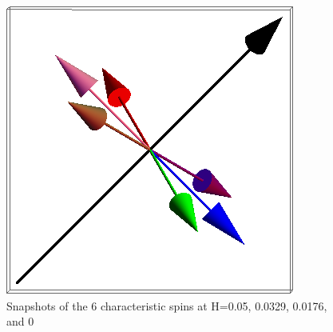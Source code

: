 \documentclass{article}
\begin{document}
\begin{figure}[ht]
\includegraphics[scale=0.27]{501S005to000R.png}
\caption{Snapshots of the 6 characteristic spins at H=0.05, 0.0329, 0.0176, and 0}
\end{figure}
\pagebreak
\end{document}
